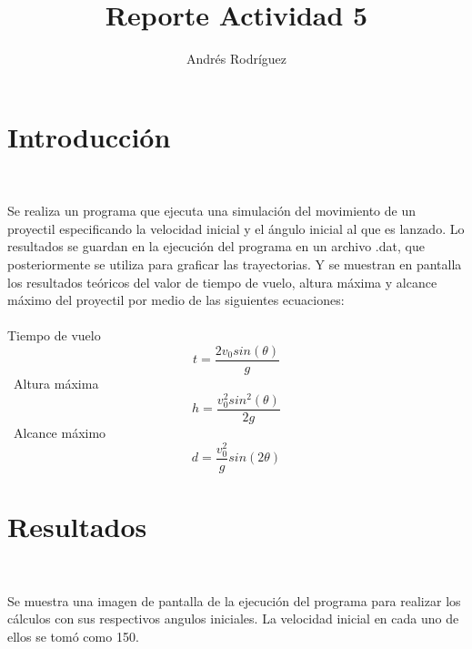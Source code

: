 \documentclass{article}
\title{Reporte Actividad 5}
\author{Andr\'es Rodr\'iguez}
\date{}
\begin{document}
\maketitle

\graphicspath{ {Imagenes/} }


\section{Introducci\'on}\

Se realiza un programa que ejecuta una simulaci\'on del movimiento de un proyectil especificando la velocidad inicial y el \'angulo inicial al que es lanzado. Lo resultados se guardan en la ejecuci\'on del programa en un archivo .dat, que posteriormente se utiliza para graficar las trayectorias. Y se muestran en pantalla los resultados te\'oricos del valor de tiempo de vuelo, altura m\'axima y alcance m\'aximo del proyectil por medio de las siguientes ecuaciones:\\ \\
Tiempo de vuelo
$$t=\frac{2 v_0 sin(\theta)}{g}$$
\ Altura m\'axima
$$h=\frac{v_0^2 sin^2(\theta)}{2g}$$
\ Alcance m\'aximo
$$d=\frac{v_0^2}{g} sin(2\theta)$$


\section{Resultados}\

Se muestra una imagen de pantalla de la ejecuci\'on del programa para realizar los c\'alculos con sus respectivos angulos iniciales. La velocidad inicial en cada uno de ellos se tom\'o como 150.
\end{document}
